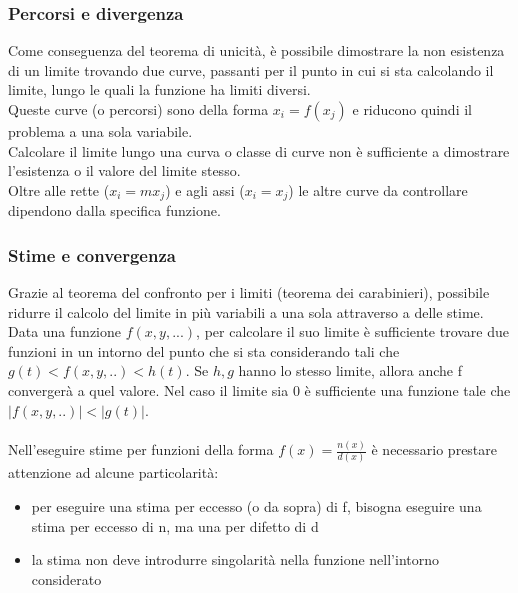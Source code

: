 \documentclass{article}
\begin{document}
\subsubsection{Percorsi e divergenza}
Come conseguenza del teorema di unicità, è possibile dimostrare la non esistenza di un limite trovando due curve, passanti per il punto in cui si sta calcolando il limite, lungo le quali la funzione ha limiti diversi.\\
Queste curve (o percorsi) sono della forma $x_i=f(x_j)$ e riducono quindi il problema a una sola variabile.\\
Calcolare il limite lungo una curva o classe di curve non è sufficiente a dimostrare l'esistenza o il valore del limite stesso.\\
Oltre alle rette ($x_i=mx_j$) e agli assi ($x_i=x_j$) le altre curve da controllare dipendono dalla specifica funzione.


\subsubsection{Stime e convergenza}
Grazie al teorema del confronto per i limiti (teorema dei carabinieri),  possibile ridurre il calcolo del limite in più variabili a una sola attraverso a delle stime.\\
Data una funzione $f(x,y,...)$, per calcolare il suo limite è sufficiente trovare due funzioni in un intorno del punto che si sta considerando tali che $g(t)<f(x,y,..)<h(t)$. Se $h,g$ hanno lo stesso limite, allora anche f convergerà a quel valore. Nel caso il limite sia 0 è sufficiente una funzione tale che $|f(x,y,..)|<|g(t)|$.\\\\
Nell'eseguire stime per funzioni della forma $f(x)=\frac{n(x)}{d(x)}$ è necessario prestare attenzione ad alcune particolarità:
\begin{itemize}
    \item per eseguire una stima per eccesso (o da sopra) di f, bisogna eseguire una stima per eccesso di n, ma una per difetto di d
    \item la stima non deve introdurre singolarità nella funzione nell'intorno considerato
\end{itemize}
\end{document}
